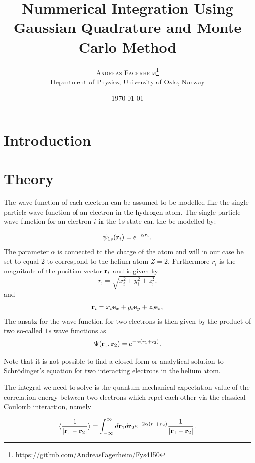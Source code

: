 \documentclass[twoside,twocolumn]{article}
\title{Nummerical Integration Using Gaussian Quadrature and Monte Carlo Method } %
\author{%
\textsc{Andreas Fagerheim}\thanks{\url{https://github.com/AndreasFagerheim/Fys4150}} \\[1ex] %
\normalsize Department of Physics, University of Oslo, Norway \\ %
}
\date{\today} %
\begin{document}
\maketitle

\section{Introduction}
\section{Theory}

The wave function of each electron can be assumed to be modelled like
the single-particle wave function of an electron in the hydrogen
atom. The single-particle wave function for an electron $i$ in the
$1s$ state can the be modelled by:



\begin{equation}
		\psi_{1s}({\bf r}_i)  =   e^{-\alpha r_i}.
\end{equation}
The parameter $\alpha$ is connected to the charge of the atom and will in our case be set to equal 2 to correspond to the helium atom $Z = 2$. Furthermore $r_i$ is the magnitude of the position vector ${\bf r}_i$ and is given by
\[
r_i = \sqrt{x_i^2+y_i^2+z_i^2}.
\]
and
\[
   {\bf r}_i =  x_i {\bf e}_x + y_i {\bf e}_y +z_i {\bf e}_z ,
\]
The ansatz for the wave function for two electrons is then given by the product of two 
so-called 
$1s$ wave functions as 
\[
   \Psi({\bf r}_1,{\bf r}_2)  =   e^{-\alpha (r_1+r_2)}.
\]

Note that it is not possible to find a closed-form or analytical
solution to Schr\"odinger's equation for two interacting electrons in
the helium atom.

The integral we need to solve is the quantum mechanical expectation
value of the correlation energy between two electrons which repel each
other via the classical Coulomb interaction, namely

\begin{equation} \label{integral}
   \langle \frac{1}{|{\bf r}_1-{\bf r}_2|} \rangle=\int_{-\infty}^{\infty} d{\bf r}_1d{\bf r}_2  e^{-2\alpha (r_1+r_2)}\frac{1}{|{\bf r}_1-{\bf r}_2|}.
\end{equation}
\end{document}
